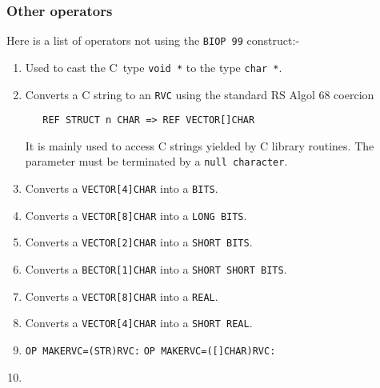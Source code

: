 \subsubsection*{Other operators}
Here is a list of operators not using the \verb|BIOP 99|
construct:-
\begin{enumerate}
\item {}\newline
Used to cast the C~type \verb|void *| to the type \verb|char *|.
\item {}\newline
Converts a C string to an \verb|RVC| using the standard
RS Algol 68 coercion
\begin{verbatim}
   REF STRUCT n CHAR => REF VECTOR[]CHAR
\end{verbatim}
\noindent
It is mainly used to access C strings yielded by C library routines.
The parameter must be terminated by a \verb|null character|.
\item {}\newline
Converts a \verb|VECTOR[4]CHAR| into a \verb|BITS|.
\item {}\newline
Converts a \verb|VECTOR[8]CHAR| into a \verb|LONG BITS|.
\item {}\newline
Converts a \verb|VECTOR[2]CHAR| into a \verb|SHORT BITS|.
\item {}\newline
Converts a \verb|BECTOR[1]CHAR| into a \verb|SHORT SHORT BITS|.
\item {}\newline
Converts a \verb|VECTOR[8]CHAR| into a \verb|REAL|.
\item {}\newline
Converts a \verb|VECTOR[4]CHAR| into a \verb|SHORT REAL|.
\item {}\newline
\verb|OP MAKERVC=(STR)RVC:|\newline
\verb|OP MAKERVC=([]CHAR)RVC:|
\item {}\newline

\end{enumerate}
